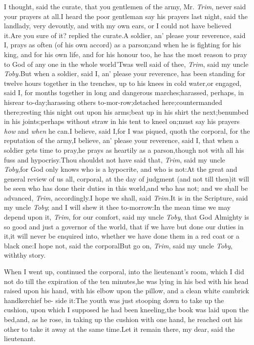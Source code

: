 \documentclass{article}
\begin{document}
I thought, said the curate, that you gentlemen of the army, Mr.
\textit{Trim}, never said your prayers at all.\tsh I heard
the poor gentleman say his prayers last night, said the landlady,
very devoutly, and with my own ears, or I could not have believed
it.\tsh Are you sure of it? replied the
curate.\tsh A soldier, an’ please your reverence,
said I, prays as often (of his own accord) as a
parson;\break\tsh and when he is fighting for his king, and for
his own life, and for his honour too, he has the most reason to
pray to God of any one in the whole world\tsh ’Twas
well said of thee, \textit{Trim}, said my uncle
\textit{Toby.}\tsh But when a soldier, said I, an’
please your reverence, has been standing for twelve hours together
in the trenches, up to his knees in cold water,\tsk or engaged,
said I, for months together in long and dangerous
marches;\tsk harassed, perhaps, in his\break rear
to-day;\tsk harassing others to-mor-\break row;\tsk detached
here;\tsk countermanded there;\tsk resting this night out upon
his arms;\tsk beat up in his shirt the next;\tsk benumbed in
his joints;\tsk perhaps without straw in his tent to kneel
on;\tsk must say his prayers \textit{how} and \textit{when} he
can.\tsk I believe, said I,\tsk for I was piqued, quoth the
corporal, for the reputation of the army,\tsk I believe,
an’ please your reverence, said I, that when a soldier gets
time to pray,\tsk he prays as heartily as a parson,\tsk though
not with all his fuss and hypocrisy.\tsh Thou shouldst not
have said that, \textit{Trim}, said my uncle \textit{Toby},\tsk for
God only knows who is a hypocrite, and who is not:\tsh At
the great and general review of us all, corporal, at the day of
judgment (and not till then)\tsk it will be seen who has done
their duties in this world,\tsk and who has not; and we shall be
advanced, \textit{Trim}, accordingly.\tsh I hope we shall,
said \textit{Trim.}\tsh It is in the Scripture, said my
uncle \textit{Toby}; and I will shew it thee to-morrow:\tsh In the
mean time we may depend upon it, \textit{Trim}, for our comfort, said
my uncle \textit{Toby}, that God Almighty is so good and just a
governor of the world, that if we have but done our duties in
it,\tsh it will never be enquired into, whether we have done them
in a red coat or a black one:\tsh\break I hope not, said the
corporal\tsh But go on, \textit{Trim}, said my uncle
\textit{Toby}, with\break thy story.

When I went up, continued the corporal, into the
lieutenant’s room, which I did not do till the expiration of
the ten minutes,\tsk he was lying in his bed with his
head raised upon his hand, with his elbow upon the pillow, and a
clean white cambrick handkerchief be- side it:\tsh The youth
was just stooping down to take up the cushion, upon which I
supposed he had been kneeling,\tsk the book was laid upon the
bed,\tsk and, as he rose, in taking up the cushion with one hand,
he reached out his other to take it away at the same
time.\tsh Let it remain there, my dear, said the
lieutenant.
\end{document}
